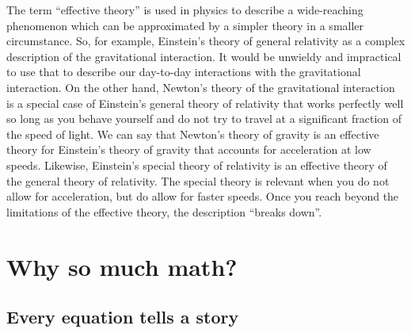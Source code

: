 \documentclass[11pt,letter,openany,makeidx]{book}
\begin{document}
The term ``effective theory'' is used in physics to describe a wide-reaching phenomenon which can be approximated by a simpler theory in a smaller circumstance.  So, for example, Einstein's theory of general relativity as a complex description of the gravitational interaction.  It would be unwieldy and impractical to use that to describe our day-to-day interactions with the gravitational interaction.  On the other hand, Newton's theory of the gravitational interaction is a special case of Einstein's general theory of relativity that works perfectly well so long as you behave yourself and do not try to travel at a significant fraction of the speed of light.  We can say that Newton's theory of gravity is an effective theory for Einstein's theory of gravity that accounts for acceleration at low speeds.  Likewise, Einstein's special theory of relativity is an effective theory of the general theory of relativity.  The special theory is relevant when you do not allow for acceleration, but do allow for faster speeds.  Once you reach beyond the limitations of the effective theory, the description ``breaks down''.


\chapter{Why so much math?}

\section{Every equation tells a story}\label{s:story}
\end{document}
